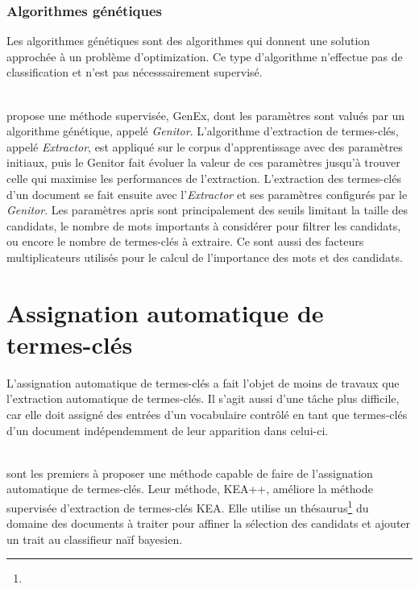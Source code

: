       \subsubsection{Algorithmes génétiques}
      \label{subsubsec:main-state_of_the_art-automatic_keyphrase_extraction-supervised_keyphrase_extraction-genex}
        Les algorithmes génétiques sont des algorithmes qui donnent une solution
        approchée à un problème d'optimization. Ce type d'algorithme
        n'effectue pas de classification et n'est pas nécesssairement supervisé.

        ~\\ propose une méthode
        supervisée, GenEx, dont les paramètres sont valués par un algorithme
        génétique, appelé \textit{Genitor}. L'algorithme d'extraction de
        termes-clés, appelé \textit{Extractor}, est appliqué sur le corpus
        d'apprentissage avec des paramètres initiaux, puis le Genitor fait
        évoluer la valeur de ces paramètres jusqu'à trouver celle qui maximise
        les performances de l'extraction. L'extraction des termes-clés d'un
        document se fait ensuite avec l'\textit{Extractor} et ses paramètres
        configurés par le \textit{Genitor}. Les paramètres apris sont
        principalement des seuils limitant la taille des candidats, le nombre de
        mots importants à considérer pour filtrer les candidats, ou encore le
        nombre de termes-clés à extraire. Ce sont aussi des facteurs
        multiplicateurs utilisés pour le calcul de l'importance des mots et des
        candidats.

  \section{Assignation automatique de termes-clés}
  \label{sec:main-state_of_the_art-automatic_keyphrase_assignment}
    L'assignation automatique de termes-clés a fait l'objet de moins de travaux
    que l'extraction automatique de termes-clés. Il s'agit aussi d'une tâche
    plus difficile, car elle doit assigné des entrées d'un vocabulaire contrôlé
    en tant que termes-clés d'un document indépendemment de leur apparition dans
    celui-ci.

    ~\\ sont les premiers à proposer une
    méthode capable de faire de l'assignation automatique de termes-clés. Leur
    méthode, KEA++, améliore la méthode supervisée d'extraction de termes-clés
    KEA. Elle utilise un thésaurus\footnote{\TODO{\dots}} du domaine des
    documents à traiter pour affiner la sélection des candidats et ajouter un
    trait au classifieur naïf bayesien.

